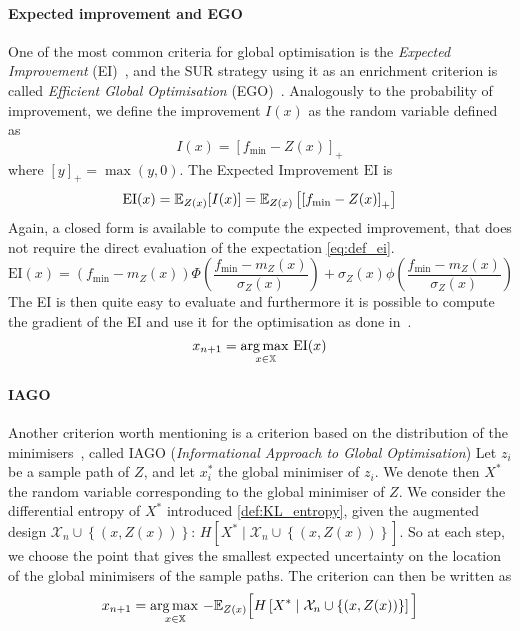 \documentclass[../../Main_ManuscritThese.tex]{subfiles}
\begin{document}
\paragraph{Expected improvement and EGO}
One of the most common criteria for global optimisation is the
\emph{Expected Improvement} (EI)~\citep{mockus_bayesian_1974}, and the
SUR strategy using it as an enrichment criterion is called
\emph{Efficient Global Optimisation}
(EGO)~\citep{jones_efficient_1998}.  Analogously to the probability of
improvement, we define the improvement $I(x)$ as the random variable
defined as
\begin{equation}
  \label{eq:def_improvement}
  I(x) = {\left[f_{\min} - Z(x)\right]}_+
\end{equation}
where $[y]_+ = \max(y, 0)$.
The Expected Improvement $\mathrm{EI}$ is 
\begin{align}
  \label{eq:def_ei}
  \mathrm{EI}(x) = \mathbb{E}_{Z(x)}[I(x)]  = \mathbb{E}_{Z(x)}\left[\left[f_{\min} - Z(x) \right]_+\right]
\end{align}
Again, a closed form is available to compute the expected improvement,
that does not require the direct evaluation of the expectation
\cref{eq:def_ei}.
\begin{equation}
  \mathrm{EI}(x) = \left(f_{\min} - m_Z(x)\right) \Phi\left(\frac{f_{\min} - m_Z(x)}{\sigma_Z(x)}\right) + \sigma_Z(x) \phi\left(\frac{f_{\min} - m_Z(x)}{\sigma_Z(x)}\right)
\end{equation}
The EI is then quite easy to evaluate and furthermore it is possible
to compute the gradient of the EI and use it for the optimisation as
done in~\cite{pardalos_differentiating_2015}.
\begin{equation}
  x_{n+1} = \operatorname*{arg\,max \,}_{x\in \mathbb{X}} \mathrm{EI}(x)
\end{equation}

\paragraph{IAGO}
\label{ssec:IAGO}
Another criterion worth mentioning is a criterion based on the
distribution of the
minimisers~\citep{villemonteix_informational_2006,hennig_entropy_2011},
called IAGO (\emph{Informational Approach to Global Optimisation}) Let
$z_i$ be a sample path of $Z$, and let $x_i^*$ the global minimiser of
$z_i$.  We denote then $X^*$ the random variable corresponding to the
global minimiser of $Z$.  We consider the differential entropy of
$X^*$ introduced \cref{def:KL_entropy}, given the augmented design
$\mathcal{X}_n \cup \left\{\left(x,Z(x)\right)\right\}$:
$H[X^*\mid \mathcal{X}_n \cup \left\{(x, Z(x))\right\}]$.  So at each
step, we choose the point that gives the smallest expected uncertainty
on the location of the global minimisers of the sample paths.  The
criterion can then be written as
\begin{equation}
  x_{n+1}= \operatorname*{arg\,max \,}_{x \in \mathbb{X}} -\mathbb{E}_{Z(x)}\Big[H\left[X^* \mid \mathcal{X}_n \cup \left\{(x, Z(x))\right\} \right]\Big]
\end{equation}
\end{document}

